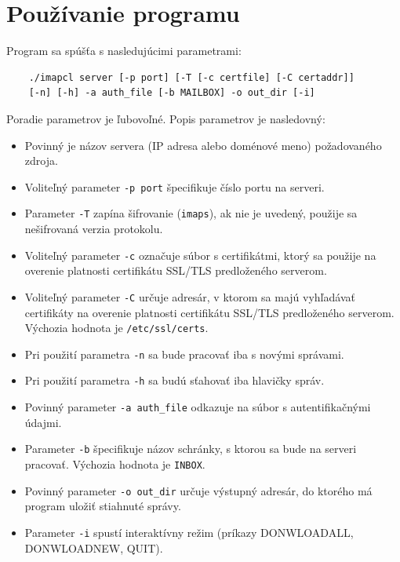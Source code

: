 \documentclass[a4paper, 11pt]{article}
\begin{document}
	\section{Používanie programu}
	Program sa spúšťa s nasledujúcimi parametrami:
	\begin{lstlisting}
	./imapcl server [-p port] [-T [-c certfile] [-C certaddr]]
	[-n] [-h] -a auth_file [-b MAILBOX] -o out_dir [-i]
	\end{lstlisting}		
	Poradie parametrov je ľubovoľné. Popis parametrov je nasledovný:
	\begin{itemize}
		\item Povinný je názov servera (IP adresa alebo doménové meno) požadovaného zdroja.
		\item Voliteľný parameter \texttt{-p port} špecifikuje číslo portu na serveri. 
		\item Parameter \texttt{-T} zapína šifrovanie (\texttt{imaps}), ak nie je uvedený, použije sa nešifrovaná verzia protokolu.
		\item Voliteľný parameter \texttt{-c} označuje súbor s certifikátmi, ktorý sa použije na overenie platnosti certifikátu SSL/TLS predloženého serverom.
		\item Voliteľný parameter \texttt{-C} určuje adresár, v ktorom sa majú vyhľadávať certifikáty na overenie platnosti certifikátu SSL/TLS predloženého serverom. Výchozia hodnota je \texttt{/etc/ssl/certs}.
		\item Pri použití parametra \texttt{-n} sa bude pracovať iba s novými správami.
		\item Pri použití parametra \texttt{-h} sa budú sťahovať iba hlavičky správ.
		\item Povinný parameter \texttt{-a auth\_file} odkazuje na súbor s autentifikačnými údajmi.
		\item Parameter \texttt{-b} špecifikuje názov schránky, s ktorou sa bude na serveri pracovať. Výchozia hodnota je \texttt{INBOX}.
		\item Povinný parameter \texttt{-o out\_dir} určuje výstupný adresár, do ktorého má program uložiť stiahnuté správy.
		\item Parameter \texttt{-i} spustí interaktívny režim (príkazy DONWLOADALL, DONWLOADNEW, QUIT).
	\end{itemize}
\end{document}
